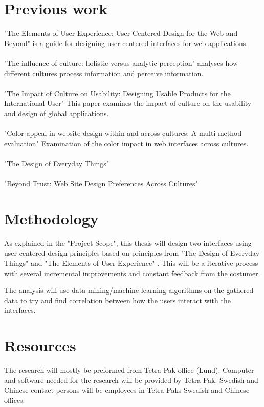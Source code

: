 \documentclass[a4paper, 11pt]{article} %
\begin{document}
	\section*{Previous work}
	
	"The Elements of User Experience: User-Centered Design for the Web and Beyond" is a guide for designing user-centered interfaces for web applications.
	\cite{Elements}
	\\\\
	"The influence of culture: holistic versus analytic perception" analyses how different cultures process information and perceive information.
	\cite{Holistic_vs_Analytic}
	\\\\
	"The Impact of Culture on Usability: Designing Usable Products for the International User" This paper examines the impact of culture on the usability and design of global applications.
	\cite{Lodge2007}
	\\\\
	"Color appeal in website design within and across cultures: A multi-method evaluation" Examination of the color impact in web interfaces across cultures.
	\cite{Color}
	\\\\
	"The Design of Everyday Things"
	\cite{Norman}
	\\\\
	"Beyond Trust: Web Site Design Preferences Across Cultures"
	\cite{Web_design_pref}
	
	
	
	\section*{Methodology}
	As explained in the "Project Scope", this thesis will design two interfaces using user centered design principles based on principles from "The Design of Everyday Things" \cite{Norman} and "The Elements of User Experience" \cite{Elements}. This will be a iterative process with several incremental improvements and constant feedback from the costumer. 
	
	The analysis will use data mining/machine learning algorithms on the gathered data to try and find correlation between how the users interact with the interfaces.
	
	\section*{Resources}
	The research will mostly be preformed from Tetra Pak office (Lund). Computer and software needed for the research will be provided by Tetra Pak. Swedish and Chinese contact persons will be employees in Tetra Paks Swedish and Chinese offices.
	
	


	
	
\end{document}
